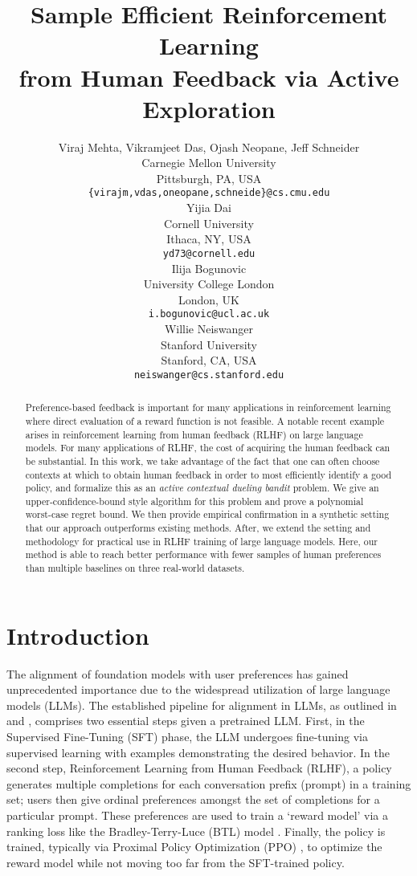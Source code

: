 \documentclass{article} \usepackage{iclr2023_conference,times}
\title{Sample Efficient Reinforcement Learning\\ from Human Feedback via Active Exploration}
\author{Viraj Mehta, Vikramjeet Das, Ojash Neopane, Jeff Schneider\\
Carnegie Mellon University\\
Pittsburgh, PA, USA \\
\texttt{\{virajm,vdas,oneopane,schneide\}@cs.cmu.edu} \\
\And
Yijia Dai \\
Cornell University \\
Ithaca, NY, USA  \\
\texttt{yd73@cornell.edu}\\
\And
Ilija Bogunovic \\
University College London \\
London, UK\\
\texttt{i.bogunovic@ucl.ac.uk}\\
\And
Willie Neiswanger \\
Stanford University \\
Stanford, CA, USA \\
\texttt{neiswanger@cs.stanford.edu} \\
}
\newcommand{\add}[1]{#1}
\begin{document}
\maketitle

\begin{abstract}
Preference-based feedback is important for many applications in reinforcement learning where direct evaluation of a reward function is not feasible. A notable recent example arises in reinforcement learning from human feedback (RLHF) on large language models. For many applications of RLHF, the cost of acquiring the human feedback can be substantial. In this work, we take advantage of the fact that one can often choose contexts at which to obtain human feedback in order to most efficiently
identify a good policy, and formalize this as an \emph{\add{active} contextual dueling bandit} problem.
We give an upper-confidence-bound style algorithm for this problem and prove a polynomial worst-case regret bound.
We then provide empirical confirmation in a synthetic setting that our approach outperforms existing methods.
After, we extend the setting and methodology for practical use in RLHF training of large language models.
Here, our method is able to reach better performance with fewer samples of human preferences than multiple baselines on three real-world datasets.
\end{abstract}

 
\vspace{-2mm}
\section{Introduction}
\label{sec:introduction}
\vspace{-2mm}
The alignment of foundation models with user preferences has gained unprecedented importance due to the widespread utilization of large language models (LLMs).
The established pipeline for alignment in LLMs, as outlined in \citet{stiennon2020} and \citet{ouyang2022training}, comprises two essential steps given a pretrained LLM.
First, in the Supervised Fine-Tuning (SFT) phase, the LLM undergoes fine-tuning via supervised learning with examples demonstrating the desired behavior.
In the second step, Reinforcement Learning from Human Feedback (RLHF),
a policy generates multiple completions for each conversation prefix (prompt) in a training set;
users then give ordinal preferences amongst the set of completions for a particular prompt.
These preferences are used to train a `reward model' via a ranking loss like the Bradley-Terry-Luce (BTL) model \citep{bradley1952rank}.
Finally, the policy is trained, typically via Proximal Policy Optimization (PPO) \citep{schulman2017proximal}, to optimize the reward model while not moving too far from the SFT-trained policy.
\end{document}
